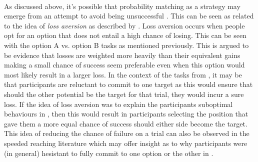 \documentclass[12pt]{article}
\begin{document}
\paragraph{} As discussed above, it's possible that probability matching as a strategy may emerge from an attempt to avoid being unsuccessful \citep{Gao2015}. This can be seen as related to the idea of \textit{loss aversion} as described by \cite{KahnemanProspect}. Loss aversion occurs when people opt for an option that does not entail a high chance of losing. This can be seen with the option A vs. option B tasks as mentioned previously. This is argued to be evidence that losses are weighted more heavily than their equivalent gains making a small chance of success seem preferable even when this option would most likely result in a larger loss. In the context of the tasks from \cite{clarke2015failure}, it may be that participants are reluctant to commit to one target as this would ensure that should the other potential be the target for that trial, they would incur a sure loss. If the idea of loss aversion was to explain the participants suboptimal behaviours in \cite{clarke2015failure}, then this would result in participants selecting the position that gave them a more equal chance of success should either side become the target. This idea of reducing the chance of failure on a trial can also be observed in the speeded reaching literature which may offer insight as to why participants were (in general) hesistant to fully commit to one option or the other in \cite{clarke2015failure}.
\end{document}
